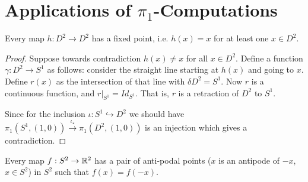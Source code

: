 \documentclass[12pt]{amsart}
\begin{document}
\newpage 

\section{Applications of $\pi_1$-Computations}

\begin{theorem}
    Every map $h: D^2 \to D^2$ has a fixed point, i.e. $h(x) = x$ for at least one $x \in D^2$. 
\end{theorem}

\begin{proof}
    Suppose towards contradiction $h(x) \neq x$ for all $x \in D^2$. Define a function $\gamma: D^2 \to S^1$ as follows: 
    consider the straight line starting at $h(x)$ and going to $x$. Define $r(x)$ as the intersection of that line with $\delta D^2 = S^1$. Now $r$ is a continuous function, and $r|_{S^1} = Id_{S^1}$. That is, $r$ is a retraction of $D^2$ to $S^1$. 
    
    Since for the inclusion $\iota: S^1 \hookrightarrow D^2$ we should have $\pi_1(S^1, (1,0)) \xrightarrow{\iota_\star} \pi_1(D^2, (1,0))$ is an injection which gives a contradiction. 
\end{proof}

\begin{theorem}
    Every map $f: S^2 \to \mathbb R^2$ has a pair of anti-podal points ($x$ is an antipode of $-x$, $x \in S^2$) in $S^2$ such that $f(x) = f(-x)$. 
\end{theorem}
\end{document}
